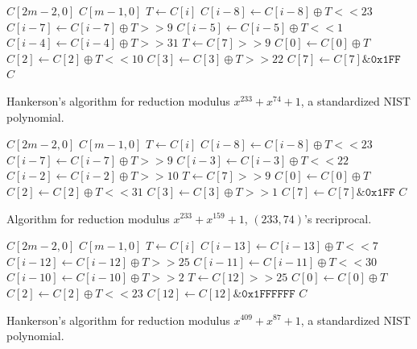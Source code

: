 


\begin{algorithm}
\begin{algorithmic}[1]
  \REQUIRE $C[2m-2,0]$
  \ENSURE $C[m-1,0]$
    \STATE $T \gets C[i]$
    \STATE $C[i-8] \gets C[i-8] \oplus T << 23$
    \STATE $C[i-7] \gets C[i-7] \oplus T >> 9$
    \STATE $C[i-5] \gets C[i-5] \oplus T << 1$
    \STATE $C[i-4] \gets C[i-4] \oplus T >> 31$
  \ENDFOR
  \STATE $T \gets C[7] >> 9$
  \STATE $C[0] \gets C[0] \oplus T$
  \STATE $C[2] \gets C[2] \oplus T << 10$
  \STATE $C[3] \gets C[3] \oplus T >> 22$
  \STATE $C[7] \gets C[7] \& \texttt{0x1FF}$
  \RETURN $C$
  \caption{Hankerson's algorithm for reduction modulus $x^{233} + x^{74} + 1$, a standardized NIST polynomial.}
  \label{alg:233_74_nist}
\end{algorithmic}
\end{algorithm}

 \begin{algorithm}
 \begin{algorithmic}[1]
  \REQUIRE $C[2m-2,0]$
  \ENSURE $C[m-1,0]$
    \STATE $T \gets C[i]$
    \STATE $C[i-8] \gets C[i-8] \oplus T << 23$
    \STATE $C[i-7] \gets C[i-7] \oplus T >> 9$
    \STATE $C[i-3] \gets C[i-3] \oplus T << 22$
    \STATE $C[i-2] \gets C[i-2] \oplus T >> 10$
  \ENDFOR
  \STATE $T \gets C[7] >> 9$
  \STATE $C[0] \gets C[0] \oplus T$
  \STATE $C[2] \gets C[2] \oplus T << 31$
  \STATE $C[3] \gets C[3] \oplus T >> 1$
  \STATE $C[7] \gets C[7] \& \texttt{0x1FF}$
  \RETURN $C$
  \caption{Algorithm for reduction modulus $x^{233} + x^{159} + 1$, $(233, 74)$'s recriprocal.}
  \label{alg:233_159}
\end{algorithmic}
\end{algorithm}

\begin{algorithm}
\begin{algorithmic}[1]
  \REQUIRE $C[2m-2,0]$
  \ENSURE $C[m-1,0]$
    \STATE $T \gets C[i]$
    \STATE $C[i-13] \gets C[i-13] \oplus T << 7$
    \STATE $C[i-12] \gets C[i-12] \oplus T >> 25$
    \STATE $C[i-11] \gets C[i-11] \oplus T << 30$
    \STATE $C[i-10] \gets C[i-10] \oplus T >> 2$
  \ENDFOR
  \STATE $T \gets C[12] >> 25$
  \STATE $C[0] \gets C[0] \oplus T$
  \STATE $C[2] \gets C[2] \oplus T << 23$
  \STATE $C[12] \gets C[12] \& \texttt{0x1FFFFFF}$
  \RETURN $C$
  \caption{Hankerson's algorithm for reduction modulus $x^{409} + x^{87} + 1$, a standardized NIST polynomial.}
  \label{alg:409_87_nist}
\end{algorithmic}
\end{algorithm}


